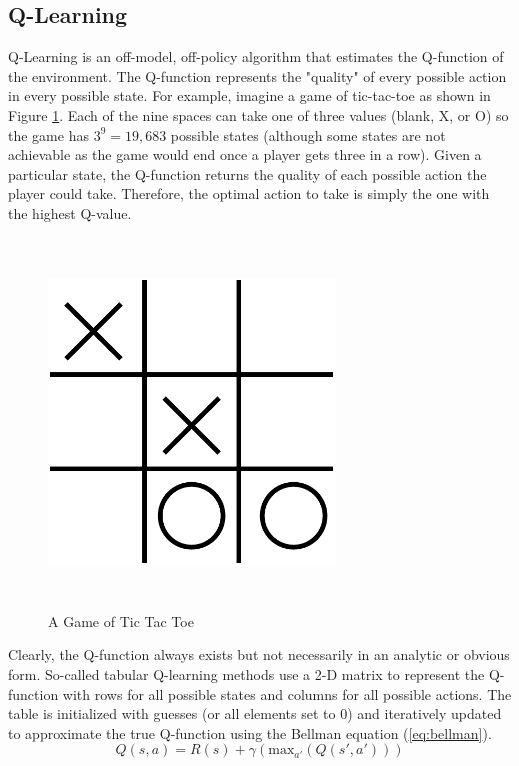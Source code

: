 \subsection{Q-Learning}
Q-Learning is an off-model, off-policy algorithm that estimates the Q-function of the environment. The Q-function represents the "quality" of every possible action in every possible state. For example, imagine a game of tic-tac-toe as shown in Figure \ref{fig:tictactoe}. Each of the nine spaces can take one of three values (blank, X, or O) so the game has $3^9=19,683$ possible states (although some states are not achievable as the game would end once a player gets three in a row). Given a particular state, the Q-function returns the quality of each possible action the player could take. Therefore, the optimal action to take is simply the one with the highest Q-value. 
\begin{figure}[H]   %
	\centering \includegraphics[width=3in, height=3.85in, keepaspectratio]{figures/tictactoe.pdf}
	\caption{A Game of Tic Tac Toe}\label{fig:tictactoe}
\end{figure}
Clearly, the Q-function always exists but not necessarily in an analytic or obvious form. So-called tabular Q-learning methods use a 2-D matrix to represent the Q-function with rows for all possible states and columns for all possible actions. The table is initialized with guesses (or all elements set to 0) and iteratively updated to approximate the true Q-function using the Bellman equation (\ref{eq:bellman}).
\begin{equation}
	\label{eq:bellman}
	Q(s,a)=R(s) + \gamma (\text{max}_{a'}(Q(s',a')))
\end{equation}

